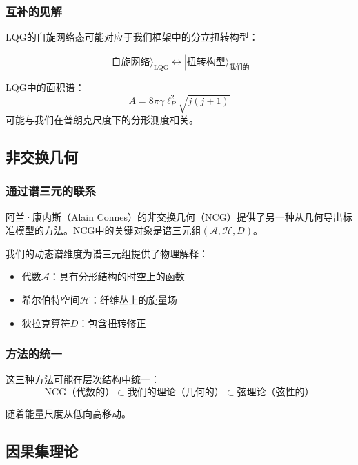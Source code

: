 \subsubsection{互补的见解}

LQG的自旋网络态可能对应于我们框架中的分立扭转构型：

\begin{equation}
    |\text{自旋网络}\rangle_{\text{LQG}} \longleftrightarrow |\text{扭转构型}\rangle_{\text{我们的}}
\end{equation}

LQG中的面积谱：
\begin{equation}
    A = 8\pi\gamma\ell_P^2 \sqrt{j(j+1)}
\end{equation}
可能与我们在普朗克尺度下的分形测度相关。

\subsection{非交换几何}

\subsubsection{通过谱三元的联系}

阿兰·康内斯（Alain Connes）的非交换几何（NCG）提供了另一种从几何导出标准模型的方法。NCG中的关键对象是谱三元组$(\mathcal{A}, \mathcal{H}, D)$。

我们的动态谱维度为谱三元组提供了物理解释：
\begin{itemize}
    \item 代数$\mathcal{A}$：具有分形结构的时空上的函数
    \item 希尔伯特空间$\mathcal{H}$：纤维丛上的旋量场
    \item 狄拉克算符$D$：包含扭转修正
\end{itemize}

\subsubsection{方法的统一}

这三种方法可能在层次结构中统一：
\begin{equation}
    \text{NCG（代数的）} \subset \text{我们的理论（几何的）} \subset \text{弦理论（弦性的）}
\end{equation}

随着能量尺度从低向高移动。

\subsection{因果集理论}

